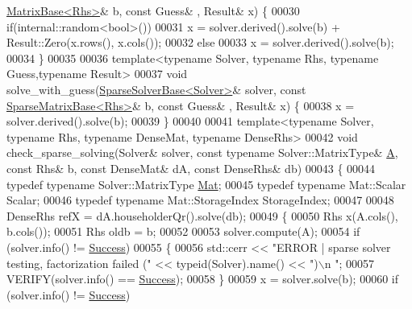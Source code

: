 \begin{DoxyCode}
      \hyperlink{group___core___module_class_eigen_1_1_matrix_base}{MatrixBase<Rhs>}& b, \textcolor{keyword}{const} Guess& , Result& x) \{
00030   \textcolor{keywordflow}{if}(internal::random<bool>())
00031     x = solver.derived().solve(b) + Result::Zero(x.rows(), x.cols());
00032   \textcolor{keywordflow}{else}
00033     x = solver.derived().solve(b);
00034 \}
00035 
00036 \textcolor{keyword}{template}<\textcolor{keyword}{typename} Solver, \textcolor{keyword}{typename} Rhs, \textcolor{keyword}{typename} Guess,\textcolor{keyword}{typename} Result>
00037 \textcolor{keywordtype}{void} solve\_with\_guess(\hyperlink{group___sparse_core___module_class_eigen_1_1_sparse_solver_base}{SparseSolverBase<Solver>}& solver, \textcolor{keyword}{const} 
      \hyperlink{group___sparse_core___module_class_eigen_1_1_sparse_matrix_base}{SparseMatrixBase<Rhs>}& b, \textcolor{keyword}{const} Guess& , Result& x) \{
00038   x = solver.derived().solve(b);
00039 \}
00040 
00041 \textcolor{keyword}{template}<\textcolor{keyword}{typename} Solver, \textcolor{keyword}{typename} Rhs, \textcolor{keyword}{typename} DenseMat, \textcolor{keyword}{typename} DenseRhs>
00042 \textcolor{keywordtype}{void} check\_sparse\_solving(Solver& solver, \textcolor{keyword}{const} \textcolor{keyword}{typename} Solver::MatrixType& \hyperlink{group___core___module_class_eigen_1_1_matrix}{A}, \textcolor{keyword}{const} Rhs& b, \textcolor{keyword}{const} 
      DenseMat& dA, \textcolor{keyword}{const} DenseRhs& db)
00043 \{
00044   \textcolor{keyword}{typedef} \textcolor{keyword}{typename} Solver::MatrixType \hyperlink{group___core___module}{Mat};
00045   \textcolor{keyword}{typedef} \textcolor{keyword}{typename} Mat::Scalar Scalar;
00046   \textcolor{keyword}{typedef} \textcolor{keyword}{typename} Mat::StorageIndex StorageIndex;
00047 
00048   DenseRhs refX = dA.householderQr().solve(db);
00049   \{
00050     Rhs x(A.cols(), b.cols());
00051     Rhs oldb = b;
00052 
00053     solver.compute(A);
00054     \textcolor{keywordflow}{if} (solver.info() != \hyperlink{group__enums_gga85fad7b87587764e5cf6b513a9e0ee5ea52581b035f4b59c203b8ff999ef5fcea}{Success})
00055     \{
00056       std::cerr << \textcolor{stringliteral}{"ERROR | sparse solver testing, factorization failed ("} << \textcolor{keyword}{typeid}(Solver).name() << \textcolor{stringliteral}{")\(\backslash\)n
      "};
00057       VERIFY(solver.info() == \hyperlink{group__enums_gga85fad7b87587764e5cf6b513a9e0ee5ea52581b035f4b59c203b8ff999ef5fcea}{Success});
00058     \}
00059     x = solver.solve(b);
00060     \textcolor{keywordflow}{if} (solver.info() != \hyperlink{group__enums_gga85fad7b87587764e5cf6b513a9e0ee5ea52581b035f4b59c203b8ff999ef5fcea}{Success})

\end{DoxyCode}
